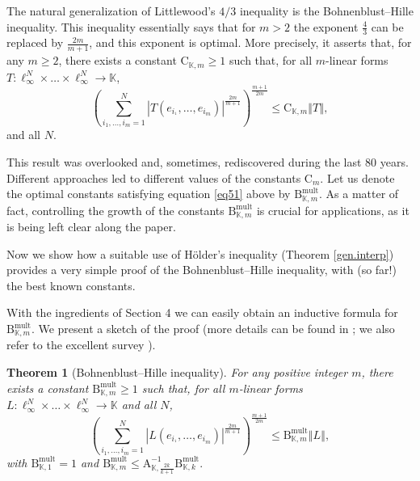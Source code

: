 \documentclass[10pt]{amsart}
\newtheorem{theorem}{Theorem}[section]
\numberwithin{equation}{section}
\begin{document}
The natural generalization of Littlewood's $4/3$ inequality is the
Bohnenblust--Hille inequality. This inequality essentially says that for $m>2 $ the exponent $\frac{4}{3}$ can be replaced by $\frac{2m}{m+1}$, and
this exponent is optimal. More precisely, it asserts that, for any $m\geq 2$, there exists a constant $\mathrm{C}_{\mathbb{K},m}\geq 1$ such that, for
all $m$-linear forms $T:\ell _{\infty }^{N}\times \dots \times \ell _{\infty
}^{N}\rightarrow \mathbb{K}$,
\begin{equation}  \label{eq51}
\left( \sum\limits_{i_{1},\ldots ,i_{m}=1}^{N}\left\vert
T(e_{i_{^{1}}},\ldots ,e_{i_{m}})\right\vert ^{\frac{2m}{m+1}}\right) ^{\frac{m+1}{2m}}\leq \mathrm{C}_{\mathbb{K},m} \left\Vert T\right\Vert,
\end{equation}
and all $N$.

This result was overlooked and, sometimes, rediscovered during the last $80$
years. Different approaches led to different values of the constants $\mathrm{C}_{m}$. Let us denote the optimal constants satisfying equation \eqref{eq51} above by $\mathrm{B}_{\mathbb{K},m}^{\mathrm{mult}}$. As a
matter of fact, controlling the growth of the constants $\mathrm{B}_{\mathbb{K},m}^{\mathrm{mult}}$ is crucial for applications, as it is being left
clear along the paper.

Now we show how a suitable use of H\"{o}lder's inequality (Theorem \ref{gen.interp}) provides a very simple proof of the Bohnenblust--Hille
inequality, with (so far!) the best known constants.

With the ingredients of Section 4 we can easily obtain an inductive formula
for $\mathrm{B}_{\mathbb{K},m}^{\mathrm{mult}}$. We present a sketch of the
proof (more details can be found in \cite{bps}; we also refer to the excellent survey \cite{sevillap}).

\begin{theorem}[Bohnenblust--Hille inequality]
\label{PROPINDUCMULT} For any positive integer $m$, there exists a constant $\mathrm{B}_{\mathbb{K},m}^{\mathrm{mult}}\geq 1$ such that, for all $m$-linear forms $L:\ell _{\infty }^{N}\times \dots \times \ell _{\infty
}^{N}\rightarrow \mathbb{K}$ and all $N$,
\begin{equation}
\left( \sum\limits_{i_{1},\ldots ,i_{m}=1}^{N}\left\vert
L(e_{i_{^{1}}},\ldots ,e_{i_{m}})\right\vert ^{\frac{2m}{m+1}}\right) ^{\frac{m+1}{2m}}\leq \mathrm{B}_{\mathbb{K},m}^{\mathrm{mult}}\left\Vert
L\right\Vert ,
\end{equation}
with $\mathrm{B}_{\mathbb{K},1}^{\mathrm{mult}}=1$ and $\mathrm{B}_{\mathbb{K},m}^{\mathrm{mult}}\leq \mathrm{A}_{\mathbb{K},\frac{2k}{k+1}}^{-1}\mathrm{B}_{\mathbb{K},k}^{\mathrm{mult}}.$
\end{theorem}
\end{document}
